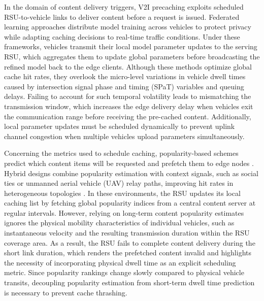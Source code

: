 \documentclass[journal]{IEEEtran}
\begin{document}
In the domain of content delivery triggers, V2I precaching exploits scheduled RSU-to-vehicle links to deliver content before a request is issued. Federated learning approaches \cite{khan2025_2, cao2025, wang2025_2} distribute model training across vehicles to protect privacy while adapting caching decisions to real-time traffic conditions. Under these frameworks, vehicles transmit their local model parameter updates to the serving RSU, which aggregates them to update global parameters before broadcasting the refined model back to the edge clients. Although these methods optimize global cache hit rates, they overlook the micro-level variations in vehicle dwell times caused by intersection signal phase and timing (SPaT) variables and queuing delays. Failing to account for such temporal volatility leads to mismatching the transmission window, which increases the edge delivery delay when vehicles exit the communication range before receiving the pre-cached content. Additionally, local parameter updates must be scheduled dynamically to prevent uplink channel congestion when multiple vehicles upload parameters simultaneously.

Concerning the metrics used to schedule caching, popularity-based schemes predict which content items will be requested and prefetch them to edge nodes \cite{su2018, huang2019, xie2026}. Hybrid designs combine popularity estimation with context signals, such as social ties or unmanned aerial vehicle (UAV) relay paths, improving hit rates in heterogeneous topologies \cite{aung2023, jiang2024, liao2025}. In these environments, the RSU updates its local caching list by fetching global popularity indices from a central content server at regular intervals. However, relying on long-term content popularity estimates ignores the physical mobility characteristics of individual vehicles, such as instantaneous velocity and the resulting transmission duration within the RSU coverage area. As a result, the RSU fails to complete content delivery during the short link duration, which renders the prefetched content invalid and highlights the necessity of incorporating physical dwell time as an explicit scheduling metric. Since popularity rankings change slowly compared to physical vehicle transits, decoupling popularity estimation from short-term dwell time prediction is necessary to prevent cache thrashing.
\end{document}
